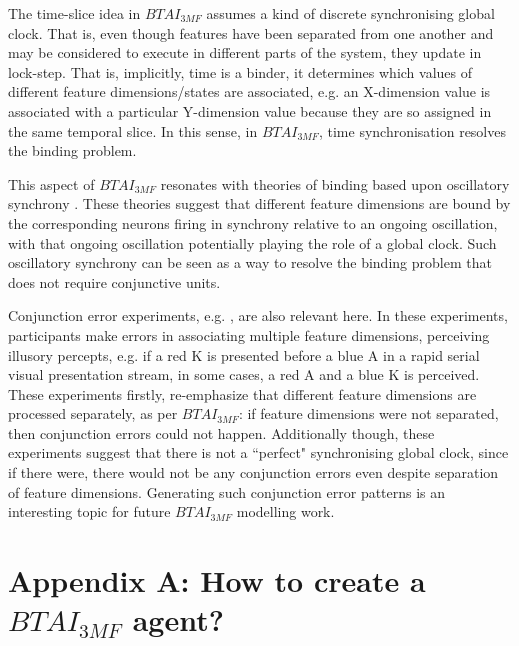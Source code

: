\documentclass[twoside,11pt]{article}
\begin{document}
The time-slice idea in $BTAI_{3MF}$ assumes a kind of discrete synchronising global clock. That is, even though features have been separated from one another and may be considered to execute in different parts of the system, they update in lock-step. That is, implicitly, time is a binder, it determines which values of different feature dimensions/states are associated, e.g. an X-dimension value is associated with a particular Y-dimension value because they are so assigned in the same temporal slice. In this sense, in $BTAI_{3MF}$, time synchronisation resolves the binding problem.

This aspect of $BTAI_{3MF}$ resonates with theories of binding based upon oscillatory synchrony \citep{uhlhaas2009neural}. These theories suggest that different feature dimensions are bound by the corresponding neurons firing in synchrony relative to an ongoing oscillation, with that ongoing oscillation potentially playing the role of a global clock. Such oscillatory synchrony can be seen as a way to resolve the binding problem that does not require conjunctive units.

Conjunction error experiments, e.g. \citet{PMID:11766936}, are also relevant here. In these experiments, participants make errors in associating multiple feature dimensions, perceiving illusory percepts, e.g. if a red K is presented before a blue A in a rapid serial visual presentation stream, in some cases, a red A and a blue K is perceived. These experiments firstly, re-emphasize that different feature dimensions are processed separately, as per $BTAI_{3MF}$: if feature dimensions were not separated, then conjunction errors could not happen. Additionally though, these experiments suggest that there is not a ``perfect" synchronising global clock, since if there were, there would not be any conjunction errors even despite separation of feature dimensions. Generating such conjunction error patterns is an interesting topic for future $BTAI_{3MF}$ modelling work.


\vskip 0.2in


\section*{Appendix A: How to create a $BTAI_{3MF}$ agent?}
\end{document}
